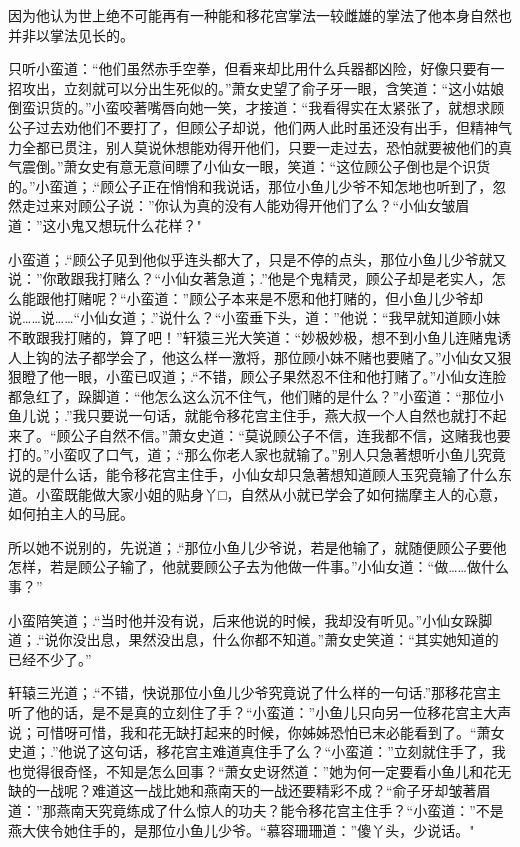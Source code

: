 \documentclass[12pt,oneside]{book}
\begin{document}
因为他认为世上绝不可能再有一种能和移花宫掌法一较雌雄的掌法了他本身自然也并非以掌法见长的。

只听小蛮道：``他们虽然赤手空拳，但看来却比用什么兵器都凶险，好像只要有一招攻出，立刻就可以分出生死似的。''萧女史望了俞子牙一眼，含笑道：``这小姑娘倒蛮识货的。''小蛮咬著嘴唇向她一笑，才接道：``我看得实在太紧张了，就想求顾公子过去劝他们不要打了，但顾公子却说，他们两人此时虽还没有出手，但精神气力全都已贯注，别人莫说休想能劝得开他们，只要一走过去，恐怕就要被他们的真气震倒。''萧女史有意无意间瞟了小仙女一眼，笑道：``这位顾公子倒也是个识货的。''小蛮道；.``顾公子正在悄悄和我说话，那位小鱼儿少爷不知怎地也听到了，忽然走过来对顾公子说：''你认为真的没有人能劝得开他们了么？``小仙女皱眉道：''这小鬼又想玩什么花样？"

小蛮道；.``顾公子见到他似乎连头都大了，只是不停的点头，那位小鱼儿少爷就又说：''你敢跟我打赌么？``小仙女著急道；.''他是个鬼精灵，顾公子却是老实人，怎么能跟他打赌呢？``小蛮道：''顾公子本来是不愿和他打赌的，但小鱼儿少爷却说\ldots\ldots 说\ldots\ldots{}``小仙女道；.''说什么？``小蛮垂下头，道：''他说：``我早就知道顾小妹不敢跟我打赌的，算了吧！''轩猿三光大笑道：``妙极妙极，想不到小鱼儿连赌鬼诱人上钩的法子都学会了，他这么样一激将，那位顾小妹不赌也要赌了。''小仙女又狠狠瞪了他一眼，小蛮已叹道；.``不错，顾公子果然忍不住和他打赌了。''小仙女连脸都急红了，跺脚道：``他怎么这么沉不住气，他们赌的是什么？''小蛮道：``那位小鱼儿说；.''我只要说一句话，就能令移花宫主住手，燕大叔一个人自然也就打不起来了。``顾公子自然不信。''萧女史道：``莫说顾公子不信，连我都不信，这赌我也要打的。''小蛮叹了口气，道；.``那么你老人家也就输了。''别人只急著想听小鱼儿究竟说的是什么话，能令移花宫主住手，小仙女却只急著想知道顾人玉究竟输了什么东道。小蛮既能做大家小姐的贴身丫□，自然从小就已学会了如何揣摩主人的心意，如何拍主人的马屁。

所以她不说别的，先说道；.``那位小鱼儿少爷说，若是他输了，就随便顾公子要他怎样，若是顾公子输了，他就要顾公子去为他做一件事。''小仙女道：``做\ldots\ldots 做什么事？''

小蛮陪笑道；.``当时他并没有说，后来他说的时候，我却没有听见。''小仙女跺脚道；.``说你没出息，果然没出息，什么你都不知道。''萧女史笑道：``其实她知道的已经不少了。''

轩辕三光道；.``不错，快说那位小鱼儿少爷究竟说了什么样的一句话.''那移花宫主听了他的话，是不是真的立刻住了手？``小蛮道：''小鱼儿只向另一位移花宫主大声说；可惜呀可惜，我和花无缺打起来的时候，你姊姊恐怕已末必能看到了。``萧女史道；.''他说了这句话，移花宫主难道真住手了么？``小蛮道：''立刻就住手了，我也觉得很奇怪，不知是怎么回事？``萧女史讶然道：''她为何一定要看小鱼儿和花无缺的一战呢？难道这一战比她和燕南天的一战还要精彩不成？``俞子牙却皱著眉道：''那燕南天究竟练成了什么惊人的功夫？能令移花宫主住手？``小蛮道：''不是燕大侠令她住手的，是那位小鱼儿少爷。``慕容珊珊道：''傻丫头，少说话。"
\end{document}
